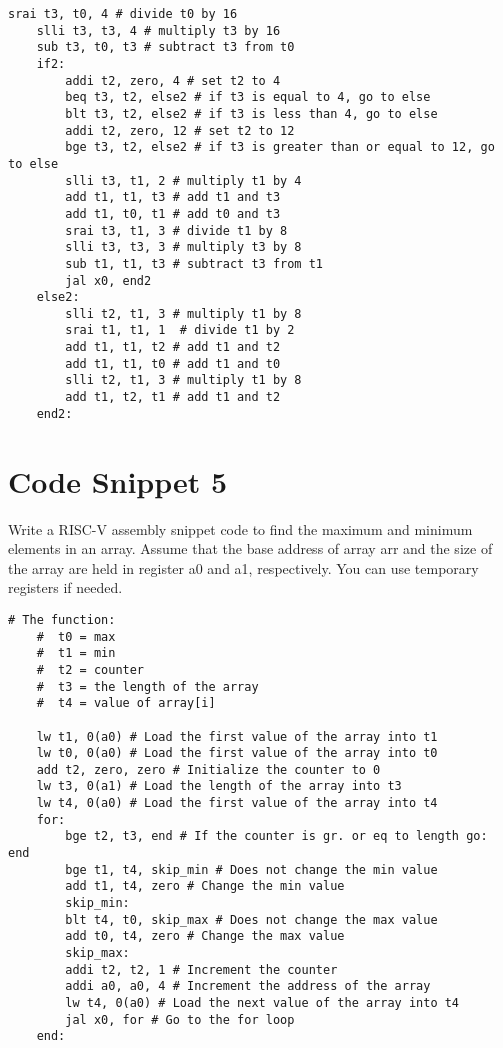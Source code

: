 \documentclass[12pt]{article}
\begin{document}
    \begin{lstlisting}[language=RISCV]
        srai t3, t0, 4 # divide t0 by 16
    slli t3, t3, 4 # multiply t3 by 16
    sub t3, t0, t3 # subtract t3 from t0
    if2:
        addi t2, zero, 4 # set t2 to 4
        beq t3, t2, else2 # if t3 is equal to 4, go to else
        blt t3, t2, else2 # if t3 is less than 4, go to else
        addi t2, zero, 12 # set t2 to 12
        bge t3, t2, else2 # if t3 is greater than or equal to 12, go to else
        slli t3, t1, 2 # multiply t1 by 4
        add t1, t1, t3 # add t1 and t3
        add t1, t0, t1 # add t0 and t3
        srai t3, t1, 3 # divide t1 by 8
        slli t3, t3, 3 # multiply t3 by 8
        sub t1, t1, t3 # subtract t3 from t1
        jal x0, end2
    else2:
        slli t2, t1, 3 # multiply t1 by 8
        srai t1, t1, 1  # divide t1 by 2
        add t1, t1, t2 # add t1 and t2
        add t1, t1, t0 # add t1 and t0
        slli t2, t1, 3 # multiply t1 by 8
        add t1, t2, t1 # add t1 and t2
    end2:
    \end{lstlisting}

    \newpage
    \section{Code Snippet 5}
    \begin{flushleft}
        Write a RISC-V assembly snippet code to find the maximum and minimum
        elements in an array. Assume that the base address of array arr and the size of the array
        are held in register a0 and a1, respectively. You can use temporary registers if needed.
    \end{flushleft}
    \begin{lstlisting}[language=RISCV]
    # The function:
    #  t0 = max
    #  t1 = min
    #  t2 = counter
    #  t3 = the length of the array
    #  t4 = value of array[i]
            
    lw t1, 0(a0) # Load the first value of the array into t1
    lw t0, 0(a0) # Load the first value of the array into t0
    add t2, zero, zero # Initialize the counter to 0
    lw t3, 0(a1) # Load the length of the array into t3
    lw t4, 0(a0) # Load the first value of the array into t4
    for:
        bge t2, t3, end # If the counter is gr. or eq to length go: end
        bge t1, t4, skip_min # Does not change the min value
        add t1, t4, zero # Change the min value
        skip_min:
        blt t4, t0, skip_max # Does not change the max value
        add t0, t4, zero # Change the max value
        skip_max:
        addi t2, t2, 1 # Increment the counter
        addi a0, a0, 4 # Increment the address of the array
        lw t4, 0(a0) # Load the next value of the array into t4
        jal x0, for # Go to the for loop
    end:
    \end{lstlisting}
\end{document}
